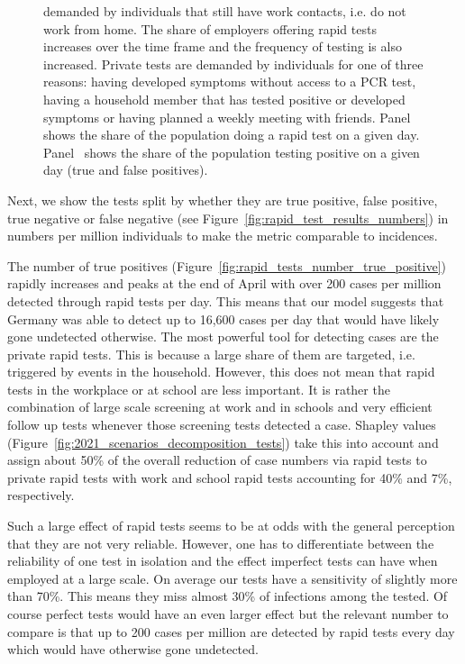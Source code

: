 \begin{figure}[ht]
{      demanded by individuals that still have work contacts, i.e. do not work from
      home. The share of employers offering rapid tests increases over the time frame
      and the frequency of testing is also increased. Private tests are demanded by
      individuals for one of three reasons: having developed symptoms without access
      to a PCR test, having a household member that has tested positive or developed
      symptoms or having planned a weekly meeting with friends.
      Panel~ shows the share of the
      population doing a rapid test on a given day.
      Panel~ shows the share of the population
      testing positive on a given day (true and false positives).}
\end{figure}

\FloatBarrier

Next, we show the tests split by whether they are true positive, false positive, true
negative or false negative (see Figure~\ref{fig:rapid_test_results_numbers}) in numbers
per million individuals to make the metric comparable to incidences.

The number of true positives (Figure~\ref{fig:rapid_tests_number_true_positive}) rapidly
increases and peaks at the end of April with over 200 cases per million detected through
rapid tests per day. This means that our model suggests that Germany was able to detect
up to 16,600 cases per day that would have likely gone undetected otherwise. The most
powerful tool for detecting cases are the private rapid tests. This is because a large
share of them are targeted, i.e. triggered by events in the household. However, this
does not mean that rapid tests in the workplace or at school are less important. It is
rather the combination of large scale screening at work and in schools and very
efficient follow up tests whenever those screening tests detected a case. Shapley values
(Figure~\ref{fig:2021_scenarios_decomposition_tests}) take this into account and assign
about 50\% of the overall reduction of case numbers via rapid tests to private rapid
tests with work and school rapid tests accounting for 40\% and 7\%, respectively.

Such a large effect of rapid tests seems to be at odds with the general perception that
they are not very reliable. However, one has to differentiate between the reliability of
one test in isolation and the effect imperfect tests can have when employed at a large
scale. On average our tests have a sensitivity of slightly more than 70\%. This means
they miss almost 30\% of infections among the tested. Of course perfect tests would have
an even larger effect but the relevant number to compare is that up to 200 cases per
million are detected by rapid tests every day which would have otherwise gone
undetected.

